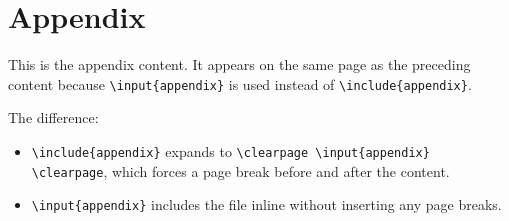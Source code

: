 \appendix
\section{Appendix}
This is the appendix content. It appears on the same page as the preceding
content because \texttt{\textbackslash input\{appendix\}} is used instead of
\texttt{\textbackslash include\{appendix\}}.

The difference:
\begin{itemize}
  \item \texttt{\textbackslash include\{appendix\}} expands to
        \texttt{\textbackslash clearpage \textbackslash input\{appendix\} \textbackslash clearpage},
        which forces a page break before and after the content.
  \item \texttt{\textbackslash input\{appendix\}} includes the file inline
        without inserting any page breaks.
\end{itemize}
